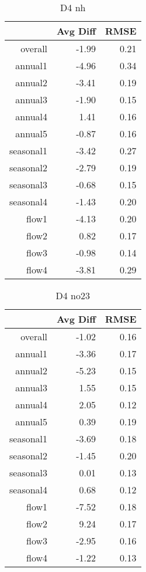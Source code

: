 \begin{table}[H]
\centering
\begin{tabular}{rrr}
  \hline
 & Avg Diff & RMSE \\ 
  \hline
overall & -1.99 & 0.21 \\ 
  annual1 & -4.96 & 0.34 \\ 
  annual2 & -3.41 & 0.19 \\ 
  annual3 & -1.90 & 0.15 \\ 
  annual4 & 1.41 & 0.16 \\ 
  annual5 & -0.87 & 0.16 \\ 
  seasonal1 & -3.42 & 0.27 \\ 
  seasonal2 & -2.79 & 0.19 \\ 
  seasonal3 & -0.68 & 0.15 \\ 
  seasonal4 & -1.43 & 0.20 \\ 
  flow1 & -4.13 & 0.20 \\ 
  flow2 & 0.82 & 0.17 \\ 
  flow3 & -0.98 & 0.14 \\ 
  flow4 & -3.81 & 0.29 \\ 
   \hline
\end{tabular}
\caption{D4 nh} 
\end{table}
\begin{table}[H]
\centering
\begin{tabular}{rrr}
  \hline
 & Avg Diff & RMSE \\ 
  \hline
overall & -1.02 & 0.16 \\ 
  annual1 & -3.36 & 0.17 \\ 
  annual2 & -5.23 & 0.15 \\ 
  annual3 & 1.55 & 0.15 \\ 
  annual4 & 2.05 & 0.12 \\ 
  annual5 & 0.39 & 0.19 \\ 
  seasonal1 & -3.69 & 0.18 \\ 
  seasonal2 & -1.45 & 0.20 \\ 
  seasonal3 & 0.01 & 0.13 \\ 
  seasonal4 & 0.68 & 0.12 \\ 
  flow1 & -7.52 & 0.18 \\ 
  flow2 & 9.24 & 0.17 \\ 
  flow3 & -2.95 & 0.16 \\ 
  flow4 & -1.22 & 0.13 \\ 
   \hline
\end{tabular}
\caption{D4 no23} 
\end{table}
